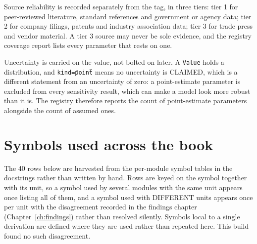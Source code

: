 \documentclass[10pt,a4paper,twoside]{report}
\begin{document}
Source reliability is recorded separately from the tag, in three tiers: tier 1 for peer-reviewed literature, standard references and government or agency data; tier 2 for company filings, patents and industry association data; tier 3 for trade press and vendor material. A tier 3 source may never be sole evidence, and the registry coverage report lists every parameter that rests on one.

Uncertainty is carried on the value, not bolted on later. A \texttt{Value} holds a distribution, and \texttt{kind=\"point\"} means no uncertainty is CLAIMED, which is a different statement from an uncertainty of zero: a point-estimate parameter is excluded from every sensitivity result, which can make a model look more robust than it is. The registry therefore reports the count of point-estimate parameters alongside the count of assumed ones.

\section*{Symbols used across the book}

The 40 rows below are harvested from the per-module symbol tables in the docstrings rather than written by hand. Rows are keyed on the symbol together with its unit, so a symbol used by several modules with the same unit appears once listing all of them, and a symbol used with DIFFERENT units appears once per unit with the disagreement recorded in the findings chapter (Chapter~\ref{ch:findings}) rather than resolved silently. Symbols local to a single derivation are defined where they are used rather than repeated here. This build found no such disagreement.

\footnotesize
\end{document}
